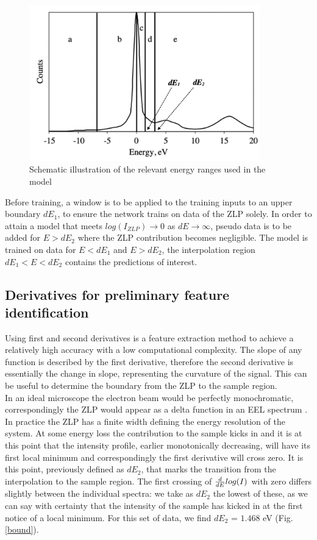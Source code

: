 \documentclass[11pt,a4paper]{article}
\def\frac#1#2{{{#1}\over {#2}}}
\numberwithin{equation}{section}
\numberwithin{figure}{section}
\numberwithin{table}{section}
\begin{document}
\begin{figure}[H]
    \centering
    \includegraphics[width=100mm]{plots/ranges.png}
    \caption{Schematic illustration of the relevant energy ranges used in the model}
    \label{ranges}
\end{figure}

Before training, a window is to be applied to the training inputs to an upper boundary $dE_1$, to ensure the network trains on data of the ZLP solely. In order to attain a model that meets $log(I_{ZLP}) \rightarrow 0$ as $dE \rightarrow \infty$, pseudo data is to be added for $E>dE_2$ where the ZLP contribution becomes negligible. The model is trained on data for $E<dE_1$ and $E>dE_2$, the interpolation region $dE_1 < E < dE_2$ contains the predictions of interest. \\

\subsection{Derivatives for preliminary feature identification}

Using first and second derivatives is a feature extraction method to achieve a relatively high accuracy with a low computational complexity. The slope of any function is described by the first derivative, therefore the second derivative is essentially the change in slope, representing the curvature of the signal. This can be useful to determine the boundary from the ZLP to the sample region. \\

In an ideal microscope the electron beam would be perfectly monochromatic, correspondingly the ZLP would appear as a delta function in an EEL spectrum \cite{Rafferty:2000}. In practice the ZLP has a finite width defining the energy resolution of the system. At some energy loss the contribution to the sample kicks in and it is at this point that the intensity profile, earlier monotonically decreasing, will have its first local minimum and correspondingly the first derivative will cross zero. It is this point, previously defined as $dE_2$, that marks the transition from the interpolation to the sample region. The first crossing of $\frac{d}{dE}log(I)$ with zero differs slightly between the individual spectra: we take as $dE_2$ the lowest of these, as we can say with certainty that the intensity of the sample has kicked in at the first notice of a local minimum. For this set of data, we find $dE_2$ = $1.468$ eV (Fig. \ref{bound}). 
\end{document}
